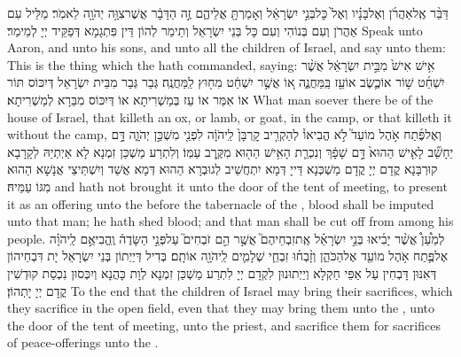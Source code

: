 {דַּבֵּ֨ר אֶֽל\maqqaf אַהֲרֹ֜ן וְאֶל\maqqaf בָּנָ֗יו וְאֶל֙ כׇּל\maqqaf בְּנֵ֣י יִשְׂרָאֵ֔ל וְאָמַרְתָּ֖ אֲלֵיהֶ֑ם זֶ֣ה הַדָּבָ֔ר אֲשֶׁר\maqqaf צִוָּ֥ה יְהֹוָ֖ה לֵאמֹֽר׃}
{מַלֵּיל עִם אַהֲרֹן וְעִם בְּנוֹהִי וְעִם כָּל בְּנֵי יִשְׂרָאֵל וְתֵימַר לְהוֹן דֵּין פִּתְגָמָא דְּפַקֵּיד יְיָ לְמֵימַר׃}
{Speak unto Aaron, and unto his sons, and unto all the children of Israel, and say unto them: This is the thing which the \lord\space hath commanded, saying:}{}
{אִ֥ישׁ אִישׁ֙ מִבֵּ֣ית יִשְׂרָאֵ֔ל אֲשֶׁ֨ר יִשְׁחַ֜ט שׁ֥וֹר אוֹ\maqqaf כֶ֛שֶׂב אוֹ\maqqaf עֵ֖ז בַּֽמַּחֲנֶ֑ה א֚וֹ אֲשֶׁ֣ר יִשְׁחַ֔ט מִח֖וּץ לַֽמַּחֲנֶֽה׃}
{גְּבַר גְּבַר מִבֵּית יִשְׂרָאֵל דְּיִכּוֹס תּוֹר אוֹ אִמַּר אוֹ עֵז בְּמַשְׁרִיתָא אוֹ דְּיִכּוֹס מִבַּרָא לְמַשְׁרִיתָא׃}
{What man soever there be of the house of Israel, that killeth an ox, or lamb, or goat, in the camp, or that killeth it without the camp,}{}
{וְאֶל\maqqaf פֶּ֜תַח אֹ֣הֶל מוֹעֵד֮ לֹ֣א הֱבִיאוֹ֒ לְהַקְרִ֤יב קׇרְבָּן֙ לַֽיהֹוָ֔ה לִפְנֵ֖י מִשְׁכַּ֣ן יְהֹוָ֑ה דָּ֣ם יֵחָשֵׁ֞ב לָאִ֤ישׁ הַהוּא֙ דָּ֣ם שָׁפָ֔ךְ וְנִכְרַ֛ת הָאִ֥ישׁ הַה֖וּא מִקֶּ֥רֶב עַמּֽוֹ׃}
{וְלִתְרַע מַשְׁכַּן זִמְנָא לָא אַיְתְיֵהּ לְקָרָבָא קוּרְבָּנָא קֳדָם יְיָ קֳדָם מַשְׁכְּנָא דַּייָ דְּמָא יִתְחֲשֵׁיב לְגוּבְרָא הַהוּא דְּמָא אֲשַׁד וְיִשְׁתֵּיצֵי אֲנָשָׁא הַהוּא מִגּוֹ עַמֵּיהּ׃}
{and hath not brought it unto the door of the tent of meeting, to present it as an offering unto the \lord\space before the tabernacle of the \lord, blood shall be imputed unto that man; he hath shed blood; and that man shall be cut off from among his people.}{}
{לְמַ֩עַן֩ אֲשֶׁ֨ר יָבִ֜יאוּ בְּנֵ֣י יִשְׂרָאֵ֗ל אֶֽת\maqqaf זִבְחֵיהֶם֮ אֲשֶׁ֣ר הֵ֣ם זֹבְחִים֮ עַל\maqqaf פְּנֵ֣י הַשָּׂדֶה֒ וֶֽהֱבִיאֻ֣ם לַֽיהֹוָ֗ה אֶל\maqqaf פֶּ֛תַח אֹ֥הֶל מוֹעֵ֖ד אֶל\maqqaf הַכֹּהֵ֑ן וְזָ֨בְח֜וּ זִבְחֵ֧י שְׁלָמִ֛ים לַֽיהֹוָ֖ה אוֹתָֽם׃}
{בְּדִיל דְּיַיְתוֹן בְּנֵי יִשְׂרָאֵל יָת דִּבְחֵיהוֹן דְּאִנּוּן דָּבְחִין עַל אַפֵּי חַקְלָא וְיַיְתוּנוּן לִקְדָם יְיָ לִתְרַע מַשְׁכַּן זִמְנָא לְוָת כָּהֲנָא וְיִכְּסוּן נִכְסַת קוּדְשִׁין קֳדָם יְיָ יָתְהוֹן׃}
{To the end that the children of Israel may bring their sacrifices, which they sacrifice in the open field, even that they may bring them unto the \lord, unto the door of the tent of meeting, unto the priest, and sacrifice them for sacrifices of peace-offerings unto the \lord.}{}
